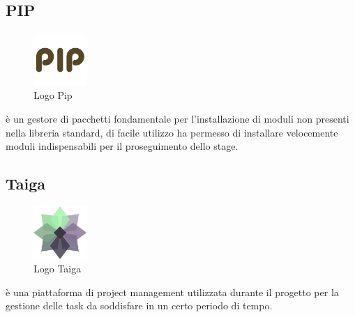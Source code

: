\subsection{PIP}
\begin{figure}[H]
	\begin{center} \includegraphics[width=2cm]{figures/pip}
		\caption[Logo Pip]{Logo Pip}
	\end{center}
\end{figure}
 è un gestore di pacchetti  fondamentale per l'installazione di moduli non presenti nella libreria standard, di facile utilizzo ha permesso di installare velocemente moduli indispensabili per il proseguimento dello stage.

\subsection{Taiga}
\begin{figure}[H]
	\begin{center} \includegraphics[width=2cm]{figures/taiga}
		\caption[Logo Taiga]{Logo Taiga}
	\end{center}
\end{figure}
 è una piattaforma di project management utilizzata durante il progetto per la gestione delle task da soddisfare in un certo periodo di tempo.